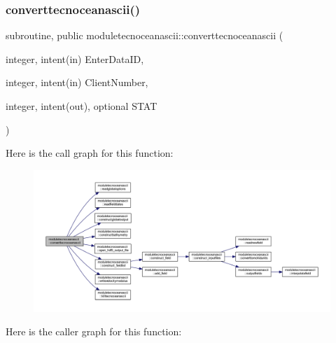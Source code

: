 \subsubsection{\texorpdfstring{converttecnoceanascii()}{converttecnoceanascii()}}
{\footnotesize\ttfamily subroutine, public moduletecnoceanascii\+::converttecnoceanascii (\begin{DoxyParamCaption}\item[{integer, intent(in)}]{Enter\+Data\+ID,  }\item[{integer, intent(in)}]{Client\+Number,  }\item[{integer, intent(out), optional}]{S\+T\+AT }\end{DoxyParamCaption})}

Here is the call graph for this function\+:\nopagebreak
\begin{figure}[H]
\begin{center}
\leavevmode
\includegraphics[width=350pt]{namespacemoduletecnoceanascii_a911ff8ebfeb289d3cf85e2a5a6543289_cgraph}
\end{center}
\end{figure}
Here is the caller graph for this function\+:\nopagebreak
